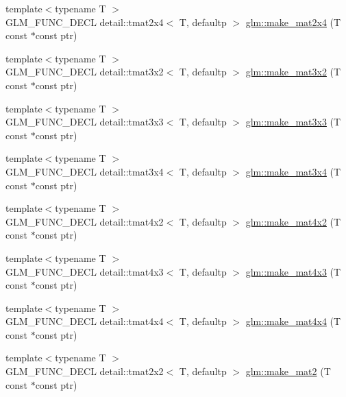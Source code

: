 \begin{DoxyCompactItemize}
\item 
{\footnotesize template$<$typename T $>$ }\\G\+L\+M\+\_\+\+F\+U\+N\+C\+\_\+\+D\+E\+CL detail\+::tmat2x4$<$ T, defaultp $>$ \hyperlink{group__gtc__type__ptr_ga174a43e8913682834de9cd918e36df25}{glm\+::make\+\_\+mat2x4} (T const $\ast$const ptr)
\item 
{\footnotesize template$<$typename T $>$ }\\G\+L\+M\+\_\+\+F\+U\+N\+C\+\_\+\+D\+E\+CL detail\+::tmat3x2$<$ T, defaultp $>$ \hyperlink{group__gtc__type__ptr_gaa40868af4de8c5ed5470fdcc9985dbfc}{glm\+::make\+\_\+mat3x2} (T const $\ast$const ptr)
\item 
{\footnotesize template$<$typename T $>$ }\\G\+L\+M\+\_\+\+F\+U\+N\+C\+\_\+\+D\+E\+CL detail\+::tmat3x3$<$ T, defaultp $>$ \hyperlink{group__gtc__type__ptr_gaf8ba0a0a523423ae1149a1c2d90eb337}{glm\+::make\+\_\+mat3x3} (T const $\ast$const ptr)
\item 
{\footnotesize template$<$typename T $>$ }\\G\+L\+M\+\_\+\+F\+U\+N\+C\+\_\+\+D\+E\+CL detail\+::tmat3x4$<$ T, defaultp $>$ \hyperlink{group__gtc__type__ptr_gaa0c07ac459a5e16374aa12e3b35ee043}{glm\+::make\+\_\+mat3x4} (T const $\ast$const ptr)
\item 
{\footnotesize template$<$typename T $>$ }\\G\+L\+M\+\_\+\+F\+U\+N\+C\+\_\+\+D\+E\+CL detail\+::tmat4x2$<$ T, defaultp $>$ \hyperlink{group__gtc__type__ptr_gae4ad99adfe4fb195a192712a71de901d}{glm\+::make\+\_\+mat4x2} (T const $\ast$const ptr)
\item 
{\footnotesize template$<$typename T $>$ }\\G\+L\+M\+\_\+\+F\+U\+N\+C\+\_\+\+D\+E\+CL detail\+::tmat4x3$<$ T, defaultp $>$ \hyperlink{group__gtc__type__ptr_ga37ec66362c22d86ad2ee11930b638c4a}{glm\+::make\+\_\+mat4x3} (T const $\ast$const ptr)
\item 
{\footnotesize template$<$typename T $>$ }\\G\+L\+M\+\_\+\+F\+U\+N\+C\+\_\+\+D\+E\+CL detail\+::tmat4x4$<$ T, defaultp $>$ \hyperlink{group__gtc__type__ptr_ga4b13ff6840a66d032724a9a1db50f704}{glm\+::make\+\_\+mat4x4} (T const $\ast$const ptr)
\item 
{\footnotesize template$<$typename T $>$ }\\G\+L\+M\+\_\+\+F\+U\+N\+C\+\_\+\+D\+E\+CL detail\+::tmat2x2$<$ T, defaultp $>$ \hyperlink{group__gtc__type__ptr_ga903422b2c346cbaccad3153a5a1f404c}{glm\+::make\+\_\+mat2} (T const $\ast$const ptr)

\end{DoxyCompactItemize}
